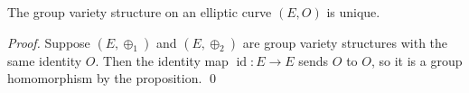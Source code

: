 \begin{corollary}
  The group variety structure on an elliptic curve \( (E,O) \) is unique.
\end{corollary}
\textit{Proof.}
Suppose \( \left( E,\oplus_1 \right) \) and \( \left( E,\oplus_2 \right) \) are group variety structures with the same identity \( O \).
Then the identity map \( \operatorname{id} \colon E \to E \) sends \( O \) to \( O \), so it is a group homomorphism by the proposition.
\qed

